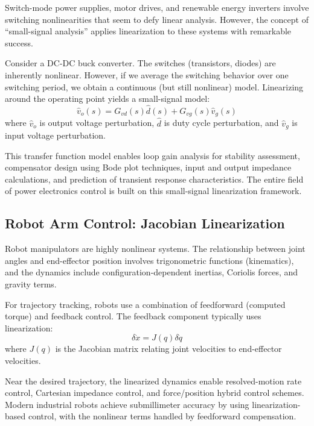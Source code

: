 Switch-mode power supplies, motor drives, and renewable energy inverters involve switching nonlinearities that seem to defy linear analysis. However, the concept of ``small-signal analysis'' applies linearization to these systems with remarkable success.

Consider a DC-DC buck converter. The switches (transistors, diodes) are inherently nonlinear. However, if we average the switching behavior over one switching period, we obtain a continuous (but still nonlinear) model. Linearizing around the operating point yields a small-signal model:
\begin{equation}
\hat{v}_o(s) = G_{vd}(s)\hat{d}(s) + G_{vg}(s)\hat{v}_g(s)
\end{equation}
where $\hat{v}_o$ is output voltage perturbation, $\hat{d}$ is duty cycle perturbation, and $\hat{v}_g$ is input voltage perturbation.

This transfer function model enables loop gain analysis for stability assessment, compensator design using Bode plot techniques, input and output impedance calculations, and prediction of transient response characteristics. The entire field of power electronics control is built on this small-signal linearization framework.

\subsection{Robot Arm Control: Jacobian Linearization}

Robot manipulators are highly nonlinear systems. The relationship between joint angles and end-effector position involves trigonometric functions (kinematics), and the dynamics include configuration-dependent inertias, Coriolis forces, and gravity terms.

For trajectory tracking, robots use a combination of feedforward (computed torque) and feedback control. The feedback component typically uses linearization:
\begin{equation}
\delta\dot{x} = J(q)\delta\dot{q}
\end{equation}
where $J(q)$ is the Jacobian matrix relating joint velocities to end-effector velocities.

Near the desired trajectory, the linearized dynamics enable resolved-motion rate control, Cartesian impedance control, and force/position hybrid control schemes. Modern industrial robots achieve submillimeter accuracy by using linearization-based control, with the nonlinear terms handled by feedforward compensation.

